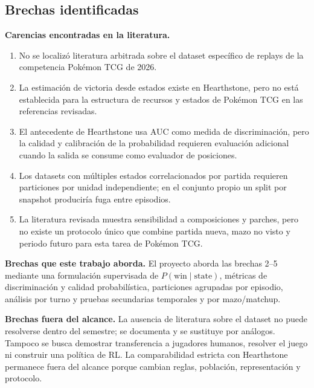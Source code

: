 \subsection{Brechas identificadas}
\label{subsec:brechas}

\textbf{Carencias encontradas en la literatura.}
\begin{enumerate}
  \item No se localizó literatura arbitrada sobre el dataset específico
  de replays de la competencia Pokémon TCG de 2026.
  \item La estimación de victoria desde estados existe en Hearthstone,
  pero no está establecida para la estructura de recursos y estados de
  Pokémon TCG en las referencias revisadas.
  \item El antecedente de Hearthstone usa AUC como medida de
  discriminación, pero la calidad y calibración de la probabilidad
  requieren evaluación adicional cuando la salida se consume como
  evaluador de posiciones.
  \item Los datasets con múltiples estados correlacionados por partida
  requieren particiones por unidad independiente; en el conjunto propio
  un split por snapshot produciría fuga entre episodios.
  \item La literatura revisada muestra sensibilidad a composiciones y
  parches, pero no existe un protocolo único que combine partida nueva,
  mazo no visto y periodo futuro para esta tarea de Pokémon TCG.
\end{enumerate}

\noindent\textbf{Brechas que este trabajo aborda.} El proyecto aborda
las brechas 2--5 mediante una formulación supervisada de
$P(\mathrm{win}\mid\mathrm{state})$, métricas de discriminación y
calidad probabilística, particiones agrupadas por episodio, análisis
por turno y pruebas secundarias temporales y por mazo/matchup.

\noindent\textbf{Brechas fuera del alcance.} La ausencia de literatura
sobre el dataset no puede resolverse dentro del semestre; se documenta
y se sustituye por análogos. Tampoco se busca demostrar transferencia a
jugadores humanos, resolver el juego ni construir una política de RL.
La comparabilidad estricta con Hearthstone permanece fuera del alcance
porque cambian reglas, población, representación y protocolo.
